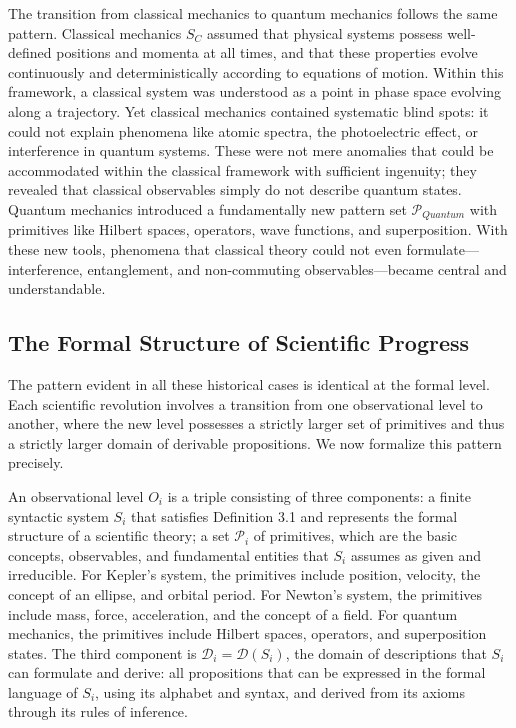 \documentclass[11pt]{article}
\begin{document}
The transition from classical mechanics to quantum mechanics follows the same pattern. Classical mechanics $S_C$ assumed that physical systems possess well-defined positions and momenta at all times, and that these properties evolve continuously and deterministically according to equations of motion. Within this framework, a classical system was understood as a point in phase space evolving along a trajectory. Yet classical mechanics contained systematic blind spots: it could not explain phenomena like atomic spectra, the photoelectric effect, or interference in quantum systems. These were not mere anomalies that could be accommodated within the classical framework with sufficient ingenuity; they revealed that classical observables simply do not describe quantum states. Quantum mechanics introduced a fundamentally new pattern set $\mathcal{P}_{Quantum}$ with primitives like Hilbert spaces, operators, wave functions, and superposition. With these new tools, phenomena that classical theory could not even formulate—interference, entanglement, and non-commuting observables—became central and understandable.


\subsection{The Formal Structure of Scientific Progress}
\label{subsec:formal_structure}

The pattern evident in all these historical cases is identical at the formal level. Each scientific revolution involves a transition from one observational level to another, where the new level possesses a strictly larger set of primitives and thus a strictly larger domain of derivable propositions. We now formalize this pattern precisely.

An observational level $O_i$ is a triple consisting of three components: a finite syntactic system $S_i$ that satisfies Definition 3.1 and represents the formal structure of a scientific theory; a set $\mathcal{P}_i$ of primitives, which are the basic concepts, observables, and fundamental entities that $S_i$ assumes as given and irreducible. For Kepler's system, the primitives include position, velocity, the concept of an ellipse, and orbital period. For Newton's system, the primitives include mass, force, acceleration, and the concept of a field. For quantum mechanics, the primitives include Hilbert spaces, operators, and superposition states. The third component is $\mathcal{D}_i = \mathcal{D}(S_i)$, the domain of descriptions that $S_i$ can formulate and derive: all propositions that can be expressed in the formal language of $S_i$, using its alphabet and syntax, and derived from its axioms through its rules of inference.
\end{document}

